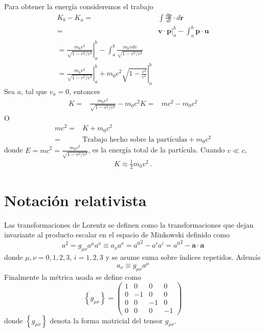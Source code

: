 Para obtener la energía consideremos el trabajo
\begin{align*}
  K_b-K_a=&\int\frac{d\mathbf{p}}{dt}\cdot d\mathbf{r}\nonumber\\
=&\mathbf{v}\cdot \mathbf{p}|_a^b-\int_a^b\mathbf{p}\cdot\mathbf{u}\nonumber\\
=\left.\frac{m_0 v^2}{\sqrt{1-{v^2}/{c^2}}}\right|_a^b-\int_a^b\frac{m_0v dv}{\sqrt{1-v^2/c^2}}\nonumber\\
=\left.\frac{m_0 v^2}{\sqrt{1-{v^2}/{c^2}}}\right|_a^b+\left.m_0 c^2\sqrt{1-\frac{v^2}{c^2}}\right|_a^b
\end{align*}
Sea $a$, tal que $v_a=0$, entonces
\begin{align*}
  K=&\frac{m_0c^2}{\sqrt{1-v^2/c^2}}-m_0 c^2
  K=&mc^2-m_0 c^2
\end{align*}
O
\begin{align*}
  mc^2=&K+m_0c^2\nonumber\\
=&\text{Trabajo hecho sobre la partículas}+m_0c^2
\end{align*}
donde $E=mc^2=\frac{m_0c^2}{\sqrt{1-v^2/c^2}}$, es la energía total de la partícula. Cuando $v\ll c$,
\begin{align*}
  K\approx \frac{1}{2}m_0 v^2\,.
\end{align*}

\section{Notación relativista}
\label{sec:srn}
Las transformaciones de Lorentz se definen como la transformaciones que dejan invariante al producto escalar en el espacio de Minkowski definido como
\begin{equation}
  \label{eq:146qft}
  a^2=g_{\mu\nu}a^\mu a^\nu\equiv a_\nu a^\nu={a^0}^2-a^i a^i={a^0}^2-\mathbf{a}\cdot\mathbf{a}
\end{equation}
donde $\mu,\nu=0,1,2,3$, $i=1,2,3$ y se asume suma sobre índices repetidos. Además
\begin{equation}
\label{eq:149qft}
  a_\nu\equiv g_{\mu\nu}a^\mu
\end{equation}
 Finalmente la métrica usada se define como
\begin{equation}
  \label{eq:gmunu}
  \left\{ g_{\mu\nu} \right\}=
  \begin{pmatrix}
    1&0&0&0\\
    0&-1&0&0\\
    0&0&-1&0\\
    0&0&0&-1
  \end{pmatrix}
\end{equation}
donde $\left\{ g_{\mu\nu} \right\}$ denota la forma matricial del tensor $g_{\mu\nu}$.  

